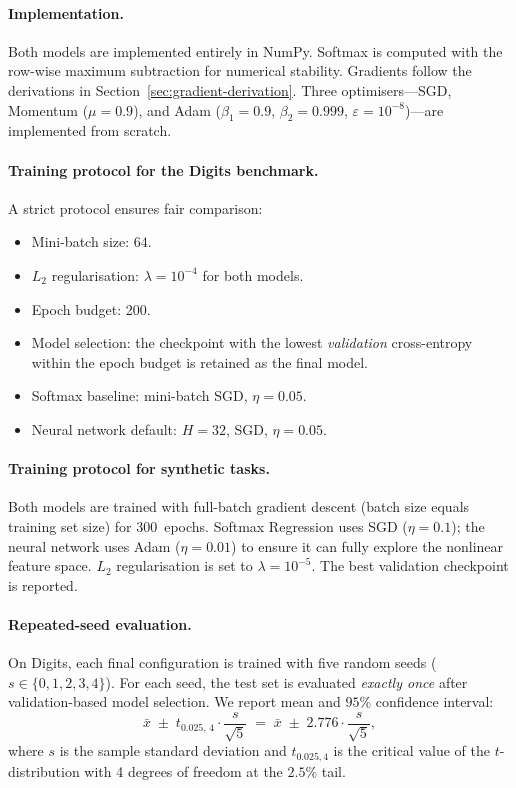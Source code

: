 \documentclass[11pt]{article}
\begin{document}
\paragraph{Implementation.}
Both models are implemented entirely in NumPy.  Softmax is computed with the row-wise
maximum subtraction for numerical stability.  Gradients follow the derivations in
Section~\ref{sec:gradient-derivation}.  Three optimisers---SGD, Momentum ($\mu{=}0.9$),
and Adam ($\beta_1{=}0.9$, $\beta_2{=}0.999$, $\varepsilon{=}10^{-8}$)---are implemented
from scratch.

\paragraph{Training protocol for the Digits benchmark.}
A strict protocol ensures fair comparison:
\begin{itemize}[leftmargin=1.4em,itemsep=0.15em]
  \item Mini-batch size: $64$.
  \item $L_2$ regularisation: $\lambda=10^{-4}$ for both models.
  \item Epoch budget: 200.
  \item Model selection: the checkpoint with the lowest \emph{validation} cross-entropy
        within the epoch budget is retained as the final model.
  \item Softmax baseline: mini-batch SGD, $\eta{=}0.05$.
  \item Neural network default: $H{=}32$, SGD, $\eta{=}0.05$.
\end{itemize}

\paragraph{Training protocol for synthetic tasks.}
Both models are trained with full-batch gradient descent (batch size equals training set
size) for 300~epochs.  Softmax Regression uses SGD ($\eta{=}0.1$); the neural network uses
Adam ($\eta{=}0.01$) to ensure it can fully explore the nonlinear feature space.
$L_2$ regularisation is set to $\lambda{=}10^{-5}$.  The best validation checkpoint is
reported.

\paragraph{Repeated-seed evaluation.}
On Digits, each final configuration is trained with five random seeds ($s \in \{0,1,2,3,4\}$).
For each seed, the test set is evaluated \emph{exactly once} after validation-based model
selection.  We report mean and $95\%$ confidence interval:
\begin{equation}\label{eq:ci}
  \bar{x}\;\pm\;t_{0.025,\,4}\cdot\frac{s}{\sqrt{5}}
  \;=\;\bar{x}\;\pm\;2.776\cdot\frac{s}{\sqrt{5}},
\end{equation}
where $s$ is the sample standard deviation and $t_{0.025,4}$ is the critical value of the
$t$-distribution with 4 degrees of freedom at the $2.5\%$ tail.
\end{document}
